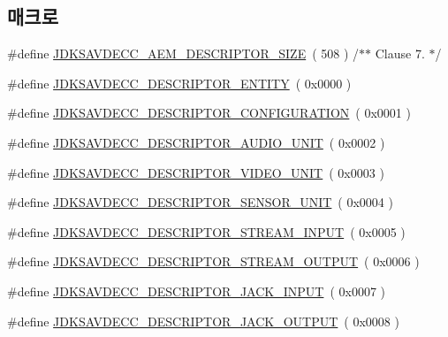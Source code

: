 \subsection*{매크로}
\begin{DoxyCompactItemize}
\item 
\#define \hyperlink{group__descriptor_ga688689ad1de92c77262259e69b838ebf}{J\+D\+K\+S\+A\+V\+D\+E\+C\+C\+\_\+\+A\+E\+M\+\_\+\+D\+E\+S\+C\+R\+I\+P\+T\+O\+R\+\_\+\+S\+I\+ZE}~( 508 ) /$\ast$$\ast$ Clause 7. $\ast$/
\item 
\#define \hyperlink{group__descriptor_gaf06b7a0bf808dc8e3104511947d694c4}{J\+D\+K\+S\+A\+V\+D\+E\+C\+C\+\_\+\+D\+E\+S\+C\+R\+I\+P\+T\+O\+R\+\_\+\+E\+N\+T\+I\+TY}~( 0x0000 )
\item 
\#define \hyperlink{group__descriptor_ga645687847f92dc28bcb37a7c334cb875}{J\+D\+K\+S\+A\+V\+D\+E\+C\+C\+\_\+\+D\+E\+S\+C\+R\+I\+P\+T\+O\+R\+\_\+\+C\+O\+N\+F\+I\+G\+U\+R\+A\+T\+I\+ON}~( 0x0001 )
\item 
\#define \hyperlink{group__descriptor_gab23787344ad4773f6486ee9d4bfa4cd2}{J\+D\+K\+S\+A\+V\+D\+E\+C\+C\+\_\+\+D\+E\+S\+C\+R\+I\+P\+T\+O\+R\+\_\+\+A\+U\+D\+I\+O\+\_\+\+U\+N\+IT}~( 0x0002 )
\item 
\#define \hyperlink{group__descriptor_ga60c25507ec46fe9d1bd13a2005e0ad2a}{J\+D\+K\+S\+A\+V\+D\+E\+C\+C\+\_\+\+D\+E\+S\+C\+R\+I\+P\+T\+O\+R\+\_\+\+V\+I\+D\+E\+O\+\_\+\+U\+N\+IT}~( 0x0003 )
\item 
\#define \hyperlink{group__descriptor_gab2cd1962dea8ce30c516f2920df9a7cd}{J\+D\+K\+S\+A\+V\+D\+E\+C\+C\+\_\+\+D\+E\+S\+C\+R\+I\+P\+T\+O\+R\+\_\+\+S\+E\+N\+S\+O\+R\+\_\+\+U\+N\+IT}~( 0x0004 )
\item 
\#define \hyperlink{group__descriptor_ga4eb0b7597f11b5fc36f3625acd82e503}{J\+D\+K\+S\+A\+V\+D\+E\+C\+C\+\_\+\+D\+E\+S\+C\+R\+I\+P\+T\+O\+R\+\_\+\+S\+T\+R\+E\+A\+M\+\_\+\+I\+N\+P\+UT}~( 0x0005 )
\item 
\#define \hyperlink{group__descriptor_gab458eb4963f42bfa5591d5dd604bedce}{J\+D\+K\+S\+A\+V\+D\+E\+C\+C\+\_\+\+D\+E\+S\+C\+R\+I\+P\+T\+O\+R\+\_\+\+S\+T\+R\+E\+A\+M\+\_\+\+O\+U\+T\+P\+UT}~( 0x0006 )
\item 
\#define \hyperlink{group__descriptor_ga3b09048c81f346536a2a09b4a721b006}{J\+D\+K\+S\+A\+V\+D\+E\+C\+C\+\_\+\+D\+E\+S\+C\+R\+I\+P\+T\+O\+R\+\_\+\+J\+A\+C\+K\+\_\+\+I\+N\+P\+UT}~( 0x0007 )
\item 
\#define \hyperlink{group__descriptor_ga012212e365b658b5cbcb27357a236404}{J\+D\+K\+S\+A\+V\+D\+E\+C\+C\+\_\+\+D\+E\+S\+C\+R\+I\+P\+T\+O\+R\+\_\+\+J\+A\+C\+K\+\_\+\+O\+U\+T\+P\+UT}~( 0x0008 )
$$
\end{DoxyCompactItemize}
